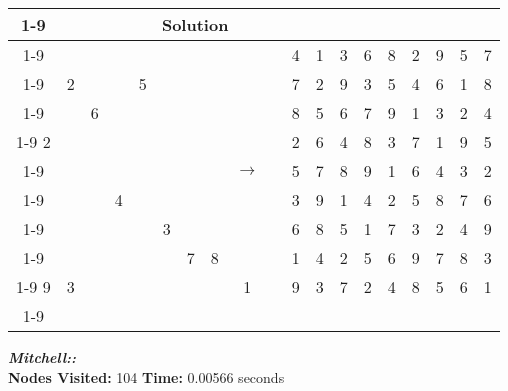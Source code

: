 \documentclass{article}
\begin{document}
\begin{tabular}{||c|c|c||c|c|c||c|c|c|| c ||c|c|c||c|c|c||c|c|c||}
  \cmidrule{1-9} \cmidrule{11-19}
  \multicolumn{9}{|c|}{Problem} &                   & \multicolumn{9}{|c|}{Solution}   \\\cmidrule{1-9} \cmidrule{11-19} \morecmidrules \cmidrule{1-9} \cmidrule{11-19}
  &   &   &   &   &   &   &   &   &  & 4 & 1 & 3 & 6 & 8 & 2 & 9 & 5 & 7\\\cmidrule{1-9} \cmidrule{11-19}
  & 2 &   &   & 5 &   &   &   &   &  & 7 & 2 & 9 & 3 & 5 & 4 & 6 & 1 & 8\\\cmidrule{1-9} \cmidrule{11-19}
  &   & 6 &   &   &   &   &   &   &  & 8 & 5 & 6 & 7 & 9 & 1 & 3 & 2 & 4\\\cmidrule{1-9} \cmidrule{11-19} \morecmidrules \cmidrule{1-9} \cmidrule{11-19}
2 &   &   &   &   &   &   &   &   &  & 2 & 6 & 4 & 8 & 3 & 7 & 1 & 9 & 5\\\cmidrule{1-9} \cmidrule{11-19}
  &   &   &   &   &   &   &   & $\rightarrow$  &  & 5 & 7 & 8 & 9 & 1 & 6 & 4 & 3 & 2\\\cmidrule{1-9} \cmidrule{11-19}
  &   &   & 4 &   &   &   &   &   &  & 3 & 9 & 1 & 4 & 2 & 5 & 8 & 7 & 6\\\cmidrule{1-9} \cmidrule{11-19} \morecmidrules \cmidrule{1-9} \cmidrule{11-19}
  &   &   &   &   & 3 &   &   &   &  & 6 & 8 & 5 & 1 & 7 & 3 & 2 & 4 & 9\\\cmidrule{1-9} \cmidrule{11-19}
  &   &   &   &   &   & 7 & 8 &   &  & 1 & 4 & 2 & 5 & 6 & 9 & 7 & 8 & 3\\\cmidrule{1-9} \cmidrule{11-19}
9 & 3 &   &   &   &   &   &   & 1 &  & 9 & 3 & 7 & 2 & 4 & 8 & 5 & 6 & 1\\\cmidrule{1-9} \cmidrule{11-19} \morecmidrules \cmidrule{1-9} \cmidrule{11-19}
\end{tabular}
\newpage
\small\emph{\textbf{Mitchell::}}\\ \textbf{Nodes Visited:} 104 \textbf{Time:} 0.00566 seconds\\
\end{document}
